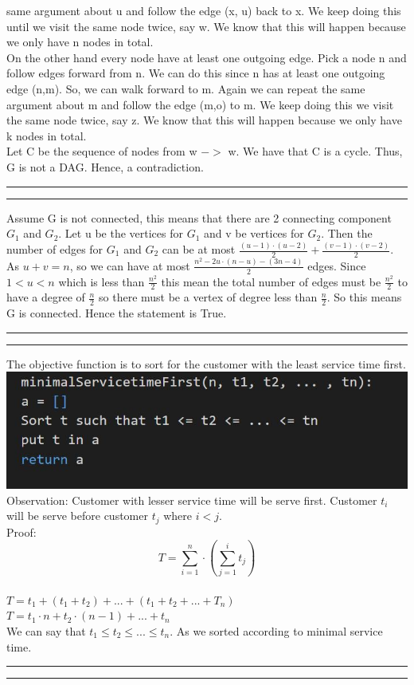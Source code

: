 \documentclass[a4paper, 11pt]{article}
\newcommand{\question}[2] {\vspace{.25in} \hrule\vspace{0.5em}
\noindent{\bf #1: #2} \vspace{0.5em}
\hrule \vspace{.10in}}
\begin{document}
same argument about u and follow the edge (x, u) back to x. We keep doing this until we visit the same node twice, say w. We know that this will happen because we only have n nodes in total.\\
On the other hand every node have at least one outgoing edge. Pick a node n and follow edges forward from n. We can do this since n has at least one outgoing edge (n,m). So, we can walk forward to m. Again we can repeat the same argument about m and follow the edge (m,o) to m. We keep doing this we visit the same node twice, say z. We know that this will happen because we only have k nodes in total.\\
Let C be the sequence of nodes from w $->$ w. We have that C is a cycle. Thus, G is not a DAG. Hence, a contradiction.
\question{3}{Problem3}
Assume G is not connected, this means that there are 2 connecting component $G_{1}$ and $G_{2}$. Let u be the vertices for $G_{1}$ and v be vertices for $G_{2}$. Then the number of edges for $G_{1}$ and $G_{2}$ can be at most $\frac{(u-1)\cdot (u-2)}{2} + \frac{(v-1) \cdot (v-2)}{2}$. As $u + v = n$, so we can have at most $\frac{n^{2} - 2u \cdot (n-u) - (3n-4)}{2}$ edges. Since $1 < u < n$ which is less than $\frac{n^{2}}{2}$ this mean the total number of edges must be $\frac{n^{2}}{2}$ to have a degree of $\frac{n}{2}$ so there must be a vertex of degree less than $\frac{n}{2}$. So this means G is connected. Hence the statement is True.
\question{4}{Problem4}
The objective function is to sort for the customer with the least service time first.\\
\includegraphics[width=\textwidth]{P4.jpg}\\
Observation: Customer with lesser service time will be serve first. Customer $t_{i}$ will be serve before customer $t_{j}$ where $i < j$.\\
Proof:\\
$$T = \sum_{i=1}^{n} \cdot  (\sum_{j=1}^{i} t_{j})$$\\
$T = t_{1} + (t_{1} + t_{2}) + ... + (t_{1} + t_{2} + ... + T_{n})$\\
$T = t_{1} \cdot n + t_{2} \cdot (n-1) + ... + t_{n}$\\
We can say that $t_{1} \leq t_{2} \leq ... \leq t_{n}$. As we sorted according to minimal service time.
\question{5}{Problem5}
\end{document}
